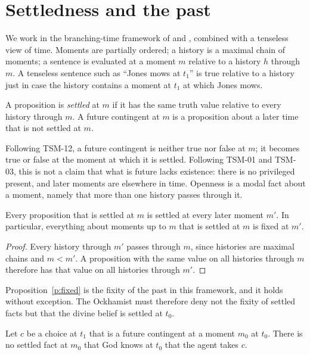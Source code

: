 \documentclass{situationist-preprint}
\begin{document}
\section{Settledness and the past}

We work in the branching-time framework of \citet{Thomason1970} and \citet{Belnap2001}, combined with a tenseless view of time. Moments are partially ordered; a history is a maximal chain of moments; a sentence is evaluated at a moment $m$ relative to a history $h$ through $m$. A tenseless sentence such as \enquote{Jones mows at $t_1$} is true relative to a history just in case the history contains a moment at $t_1$ at which Jones mows.

\begin{definition}\label{d:settled}
A proposition is \emph{settled} at $m$ if it has the same truth value relative to every history through $m$. A future contingent at $m$ is a proposition about a later time that is not settled at $m$.
\end{definition}

Following TSM-12, a future contingent is neither true nor false at $m$; it becomes true or false at the moment at which it is settled. Following TSM-01 and TSM-03, this is not a claim that what is future lacks existence: there is no privileged present, and later moments are elsewhere in time. Openness is a modal fact about a moment, namely that more than one history passes through it.

\begin{proposition}\label{p:fixed}
Every proposition that is settled at $m$ is settled at every later moment $m'$. In particular, everything about moments up to $m$ that is settled at $m$ is fixed at $m'$.
\end{proposition}

\begin{proof}
Every history through $m'$ passes through $m$, since histories are maximal chains and $m < m'$. A proposition with the same value on all histories through $m$ therefore has that value on all histories through $m'$.
\end{proof}

Proposition~\ref{p:fixed} is the fixity of the past in this framework, and it holds without exception. The Ockhamist must therefore deny not the fixity of settled facts but that the divine belief is settled at $t_0$.

\begin{proposition}\label{p:nobelief}
Let $c$ be a choice at $t_1$ that is a future contingent at a moment $m_0$ at $t_0$. There is no settled fact at $m_0$ that God knows at $t_0$ that the agent takes $c$.
\end{proposition}
\end{document}
